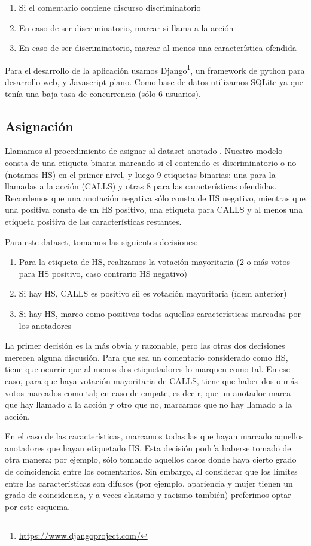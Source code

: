 \begin{enumerate}
    \item Si el comentario contiene discurso discriminatorio
    \item En caso de ser discriminatorio, marcar si llama a la acción
    \item En caso de ser discriminatorio, marcar al menos una característica ofendida
\end{enumerate}

Para el desarrollo de la aplicación usamos Django\footnote{\url{https://www.djangoproject.com/}}, un framework de python para desarrollo web, y Javascript plano. Como base de datos utilizamos SQLite ya que tenía una baja tasa de concurrencia (sólo 6 usuarios).

\subsection{Asignación}

Llamamos  al procedimiento de asignar  al dataset anotado \cite{pustejovsky2012natural}. Nuestro modelo consta de una etiqueta binaria marcando si el contenido es discriminatorio o no (notamos HS) en el primer nivel, y luego 9 etiquetas binarias: una para la llamadas a la acción (CALLS) y otras 8 para las características ofendidas. Recordemos que una anotación negativa sólo consta de HS negativo, mientras que una positiva consta de un HS positivo, una etiqueta para CALLS y al menos una etiqueta positiva de las características restantes.

Para este dataset, tomamos las siguientes decisiones:

\begin{enumerate}
    \item Para la etiqueta de HS, realizamos la votación mayoritaria (2 o más votos para HS positivo, caso contrario HS negativo)
    \item Si hay HS, CALLS es positivo sii es votación mayoritaria (ídem anterior)
    \item Si hay HS, marco como positivas todas aquellas características marcadas por los anotadores
\end{enumerate}

La primer decisión es la más obvia y razonable, pero las otras dos decisiones merecen alguna discusión. Para que sea un comentario considerado como HS, tiene que ocurrir que al menos dos etiquetadores lo marquen como tal. En ese caso, para que haya votación mayoritaria de CALLS, tiene que haber dos o más votos marcados como tal; en caso de empate, es decir, que un anotador marca que hay llamado a la acción y otro que no, marcamos que no hay llamado a la acción.

En el caso de las características, marcamos todas las que hayan marcado aquellos anotadores que hayan etiquetado HS. Esta decisión podría haberse tomado de otra manera; por ejemplo, sólo tomando aquellos casos donde haya cierto grado de coincidencia entre los comentarios. Sin embargo, al considerar que los límites entre las características son difusos (por ejemplo, apariencia y mujer tienen un grado de coincidencia, y a veces clasismo y racismo también) preferimos optar por este esquema.

